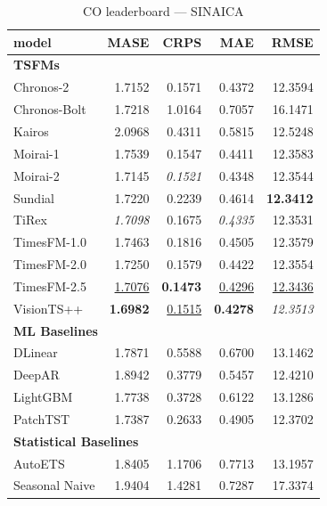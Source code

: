 \begin{table}[H]
\caption{CO leaderboard --- SINAICA}
\centering
\begin{small}
\begin{tabular}{lrrrr}
\toprule
model & MASE & CRPS & MAE & RMSE \\
\midrule
\multicolumn{5}{l}{\textbf{TSFMs}} \\
Chronos-2 & 1.7152 & 0.1571 & 0.4372 & 12.3594 \\
Chronos-Bolt & 1.7218 & 1.0164 & 0.7057 & 16.1471 \\
Kairos & 2.0968 & 0.4311 & 0.5815 & 12.5248 \\
Moirai-1 & 1.7539 & 0.1547 & 0.4411 & 12.3583 \\
Moirai-2 & 1.7145 & \textit{0.1521} & 0.4348 & 12.3544 \\
Sundial & 1.7220 & 0.2239 & 0.4614 & \textbf{12.3412} \\
TiRex & \textit{1.7098} & 0.1675 & \textit{0.4335} & 12.3531 \\
TimesFM-1.0 & 1.7463 & 0.1816 & 0.4505 & 12.3579 \\
TimesFM-2.0 & 1.7250 & 0.1579 & 0.4422 & 12.3554 \\
TimesFM-2.5 & \underline{1.7076} & \textbf{0.1473} & \underline{0.4296} & \underline{12.3436} \\
VisionTS++ & \textbf{1.6982} & \underline{0.1515} & \textbf{0.4278} & \textit{12.3513} \\
\midrule
\multicolumn{5}{l}{\textbf{ML Baselines}} \\
DLinear & 1.7871 & 0.5588 & 0.6700 & 13.1462 \\
DeepAR & 1.8942 & 0.3779 & 0.5457 & 12.4210 \\
LightGBM & 1.7738 & 0.3728 & 0.6122 & 13.1286 \\
PatchTST & 1.7387 & 0.2633 & 0.4905 & 12.3702 \\
\midrule
\multicolumn{5}{l}{\textbf{Statistical Baselines}} \\
AutoETS & 1.8405 & 1.1706 & 0.7713 & 13.1957 \\
Seasonal Naive & 1.9404 & 1.4281 & 0.7287 & 17.3374 \\
\bottomrule
\end{tabular}
\end{small}
\end{table}